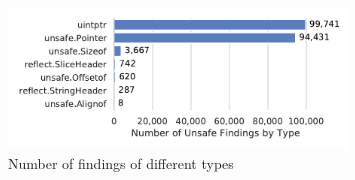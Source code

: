 \begin{figure}[htp!]
    \centering
    \includegraphics[width=0.8\textwidth]{assets/plots/chapter4/distribution-unsafe-types.pdf}
    \caption{Number of \unsafe{} findings of different types}
    \label{fig:unsafe-tokens-distribution}
\end{figure}
